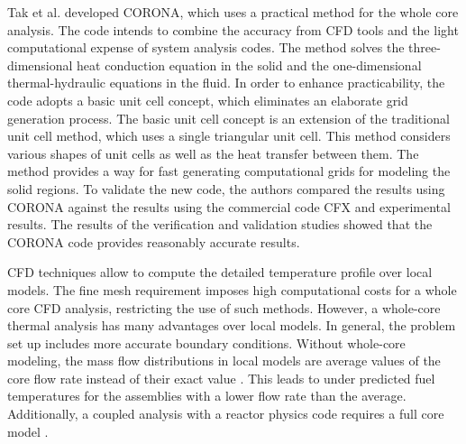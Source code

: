 \documentclass[11pt,letterpaper]{article}
\begin{document}
Tak et al. \cite{tak_practical_2012} \cite{tak_development_2014} developed CORONA, which uses a practical method for the whole core analysis.
The code intends to combine the accuracy from CFD tools and the light computational expense of system analysis codes.
The method solves the three-dimensional heat conduction equation in the solid and the one-dimensional thermal-hydraulic equations in the fluid.
In order to enhance practicability, the code adopts a basic unit cell concept, which eliminates an elaborate grid generation process.
The basic unit cell concept is an extension of the traditional unit cell method, which uses a single triangular unit cell.
This method considers various shapes of unit cells as well as the heat transfer between them.
The method provides a way for fast generating computational grids for modeling the solid regions.
To validate the new code, the authors compared the results using CORONA against the results using the commercial code CFX and experimental results.
The results of the verification and validation studies showed that the CORONA code provides reasonably accurate results.

CFD techniques allow to compute the detailed temperature profile over local models.
The fine mesh requirement imposes high computational costs for a whole core CFD analysis, restricting the use of such methods.
However, a whole-core thermal analysis has many advantages over local models.
In general, the problem set up includes more accurate boundary conditions.
Without whole-core modeling, the mass flow distributions in local models are average values of the core flow rate instead of their exact value \cite{huning_novel_2016}.
This leads to under predicted fuel temperatures for the assemblies with a lower flow rate than the average.
Additionally, a coupled analysis with a reactor physics code requires a full core model \cite{tak_practical_2012}.

\end{document}
